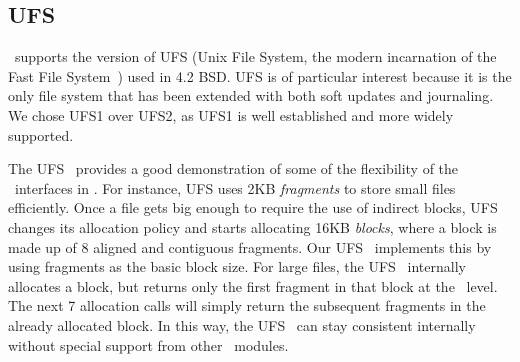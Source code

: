 \subsection{UFS}
\label{sec:modules:ufs}

\Kudos\ supports the version of UFS (Unix File System, the modern incarnation of
the Fast File System~\cite{mckusick84fast}) used in 4.2 BSD. UFS is of
particular interest because it is the only file system that has been extended
with both soft updates and journaling.~\cite{seltzer00journaling} We chose UFS1
over UFS2, as UFS1 is well established and more widely supported.

The UFS \module\ provides a good demonstration of some of the flexibility of the
\module\ interfaces in \Kudos. For instance, UFS uses 2KB \emph{fragments} to
store small files efficiently. Once a file gets big enough to require the use of
indirect blocks, UFS changes its allocation policy and starts allocating 16KB
\emph{blocks}, where a block is made up of 8 aligned and contiguous fragments.
Our UFS \module\ implements this by using fragments as the basic block size. For
large files, the UFS \module\ internally allocates a block, but returns only the
first fragment in that block at the \LFS\ level. The next 7 allocation calls
will simply return the subsequent fragments in the already allocated block. In
this way, the UFS \module\ can stay consistent internally without special
support from other \Kudos\ modules.
